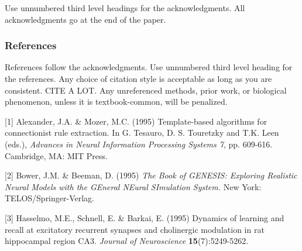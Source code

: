\documentclass{article} %
\begin{document}
Use unnumbered third level headings for the acknowledgments. All
acknowledgments go at the end of the paper.

\subsubsection*{References}

References follow the acknowledgments. Use unnumbered third level heading for
the references. Any choice of citation style is acceptable as long as you are
consistent. CITE A LOT. Any unreferenced methods, prior work, or biological phenomenon, unless it is textbook-common, will be penalized.

\small{
[1] Alexander, J.A. \& Mozer, M.C. (1995) Template-based algorithms
for connectionist rule extraction. In G. Tesauro, D. S. Touretzky
and T.K. Leen (eds.), {\it Advances in Neural Information Processing
Systems 7}, pp. 609-616. Cambridge, MA: MIT Press.

[2] Bower, J.M. \& Beeman, D. (1995) {\it The Book of GENESIS: Exploring
Realistic Neural Models with the GEneral NEural SImulation System.}
New York: TELOS/Springer-Verlag.

[3] Hasselmo, M.E., Schnell, E. \& Barkai, E. (1995) Dynamics of learning
and recall at excitatory recurrent synapses and cholinergic modulation
in rat hippocampal region CA3. {\it Journal of Neuroscience}
{\bf 15}(7):5249-5262.
}
\end{document}
